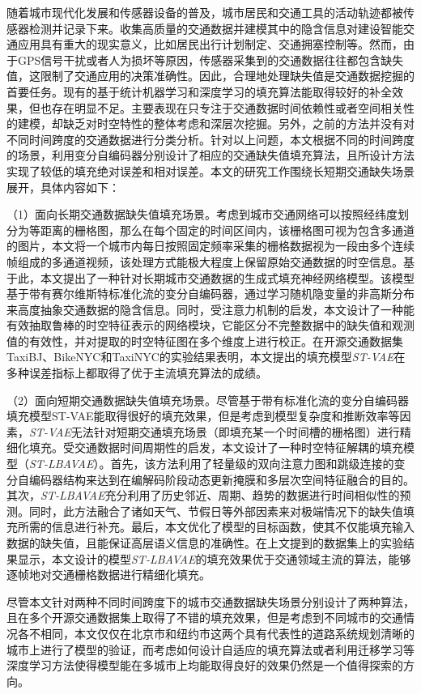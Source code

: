 \begin{conclusions}
随着城市现代化发展和传感器设备的普及，城市居民和交通工具的活动轨迹都被传感器检测并记录下来。收集高质量的交通数据并建模其中的隐含信息对建设智能交通应用具有重大的现实意义，比如居民出行计划制定、交通拥塞控制等。然而，由于GPS信号干扰或者人为损坏等原因，传感器采集到的交通数据往往都包含缺失值，这限制了交通应用的决策准确性。因此，合理地处理缺失值是交通数据挖掘的首要任务。现有的基于统计机器学习和深度学习的填充算法能取得较好的补全效果，但也存在明显不足。主要表现在只专注于交通数据时间依赖性或者空间相关性的建模，却缺乏对时空特性的整体考虑和深层次挖掘。另外，之前的方法并没有对不同时间跨度的交通数据进行分类分析。针对以上问题，本文根据不同的时间跨度的场景，利用变分自编码器分别设计了相应的交通缺失值填充算法，且所设计方法实现了较低的填充绝对误差和相对误差。本文的研究工作围绕长短期交通缺失场景展开，具体内容如下：

（1）面向长期交通数据缺失值填充场景。考虑到城市交通网络可以按照经纬度划分为等距离的栅格图，那么在每个固定的时间区间内，该栅格图可视为包含多通道的图片，本文将一个城市内每日按照固定频率采集的栅格数据视为一段由多个连续帧组成的多通道视频，该处理方式能极大程度上保留原始交通数据的时空信息。基于此，本文提出了一种针对长期城市交通数据的生成式填充神经网络模型。该模型基于带有赛尔维斯特标准化流的变分自编码器，通过学习随机隐变量的非高斯分布来高度抽象交通数据的隐含信息。同时，受注意力机制的启发，本文设计了一种能有效抽取鲁棒的时空特征表示的网络模块，它能区分不完整数据中的缺失值和观测值的有效性，并对提取的时空特征图在多个维度上进行校正。在开源交通数据集TaxiBJ、BikeNYC和TaxiNYC的实验结果表明，本文提出的填充模型\textit{ST-VAE}在多种误差指标上都取得了优于主流填充算法的成绩。

（2）面向短期交通数据缺失值填充场景。尽管基于带有标准化流的变分自编码器填充模型ST-VAE能取得很好的填充效果，但是考虑到模型复杂度和推断效率等因素，\textit{ST-VAE}无法针对短期交通填充场景（即填充某一个时间槽的栅格图）进行精细化填充。受交通数据时间周期性的启发，本文设计了一种时空特征解耦的填充模型（\textit{ST-LBAVAE}）。首先，该方法利用了轻量级的双向注意力图和跳级连接的变分自编码器结构来达到在编解码阶段动态更新掩膜和多层次空间特征融合的目的。其次，\textit{ST-LBAVAE}充分利用了历史邻近、周期、趋势的数据进行时间相似性的预测。同时，此方法融合了诸如天气、节假日等外部因素来对极端情况下的缺失值填充所需的信息进行补充。最后，本文优化了模型的目标函数，使其不仅能填充输入数据的缺失值，且能保证高层语义信息的准确性。在上文提到的数据集上的实验结果显示，本文设计的模型\textit{ST-LBAVAE}的填充效果优于交通领域主流的算法，能够逐帧地对交通栅格数据进行精细化填充。

尽管本文针对两种不同时间跨度下的城市交通数据缺失场景分别设计了两种算法，且在多个开源交通数据集上取得了不错的填充效果，但是考虑到不同城市的交通情况各不相同，本文仅仅在北京市和纽约市这两个具有代表性的道路系统规划清晰的城市上进行了模型的验证，而考虑如何设计自适应的填充算法或者利用迁移学习等深度学习方法使得模型能在多城市上均能取得良好的效果仍然是一个值得探索的方向。

\end{conclusions}
